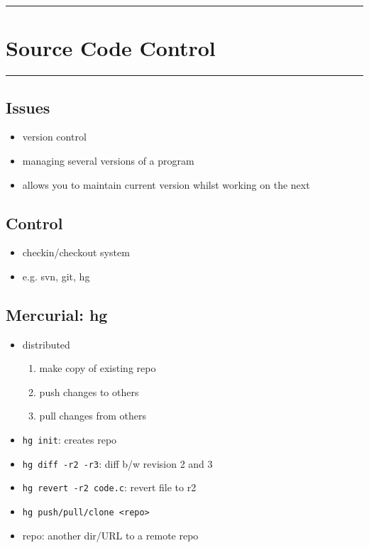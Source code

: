 \documentclass[10pt, multicolumn, a4paper]{article}
\begin{document}

\hrule
\section{Source Code Control}
\hrule 

\begin{multicols}{2}
	\subsection*{Issues}
	\begin{itemize}
	\item version control
	\item managing several versions of a program
	\item allows you to maintain current version whilst working on the next
	\end{itemize}
	\subsection*{Control}
	\begin{itemize}
	\item checkin/checkout system
	\item e.g. svn, git, hg
	\end{itemize}
	\subsection*{Mercurial: hg}
	\begin{itemize}
	\item distributed
		\begin{enumerate}
		\item make copy of existing repo
		\item push changes to others
		\item pull changes from others
		\end{enumerate}
	\item \verb|hg init|: creates repo
	\item \verb|hg diff -r2 -r3|: diff b/w revision 2 and 3
	\item \verb|hg revert -r2 code.c|: revert file to r2
	\item \verb|hg push/pull/clone <repo>|
	\item repo: another dir/URL to a remote repo
	\end{itemize}
\end{multicols}
\end{document}
